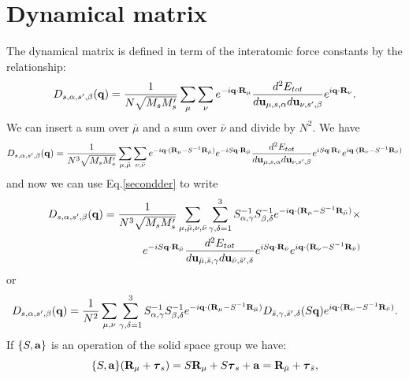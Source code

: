 \documentclass[12pt,a4paper,twoside]{report}
\begin{document}
\section{Dynamical matrix}

The dynamical matrix is defined in term of the interatomic force constants by the relationship:
\begin{equation}
D_{s,\alpha,s',\beta}({\bf q}) =
{1 \over N \sqrt{M_s M_s'}} \sum_{\mu} \sum_{\nu}
e^{-i {\bf q} \cdot {\bf R}_\mu}
{d^2 E_{tot} \over d {\bf u}_{\mu,s,\alpha} d {\bf u}_{\nu,s',\beta}}
e^{i {\bf q} \cdot {\bf R}_\nu}.
\label{dyn_mat}
\end{equation}
We can insert a sum over $\bar \mu$ and a sum over
$\bar \nu$ and divide by $N^2$. We have
\begin{equation}
D_{s,\alpha,s',\beta}({\bf q}) =
{1 \over N^3 \sqrt{M_s M_s'}} \sum_{\mu,\bar \mu} \sum_{\nu,\bar \nu}
e^{-i {\bf q} \cdot ({\bf R}_\mu - S^{-1}{\bf R}_{\bar \mu}) }
e^{-i S {\bf q} \cdot {\bf R}_{\bar \mu}}
{d^2 E_{tot} \over d {\bf u}_{\mu,s,\alpha} d {\bf u}_{\nu,s',\beta}}
e^{i S {\bf q} \cdot {\bf R}_{\bar \nu}}
e^{i {\bf q} \cdot ({\bf R}_\nu - S^{-1}{\bf R}_{\bar \nu})}
\end{equation}
and now we can use Eq.\ref{secondder} to write
\begin{eqnarray}
D_{s,\alpha,s',\beta}({\bf q}) =
{1 \over N^3 \sqrt{M_s M_s'}} \sum_{\mu,\bar \mu, \nu,\bar \nu} \sum_{\gamma,\delta=1}^3  S^{-1}_{\alpha,\gamma} S^{-1}_{\beta,\delta}
e^{-i {\bf q} \cdot ({\bf R}_\mu - S^{-1}{\bf R}_{\bar \mu}) } \times \nonumber \\
e^{-i S{\bf q} \cdot {\bf R}_{\bar \mu}}
{d^2 E_{tot} \over d {\bf u}_{{\bar \mu},{\bar s},\gamma}d {\bf u}_{{\bar \nu},{\bar s}',\delta} }
e^{i S{\bf q} \cdot {\bf R}_{\bar \nu}}
e^{i {\bf q} \cdot ({\bf R}_\nu - S^{-1}{\bf R}_{\bar \nu})}
\end{eqnarray}
or
\begin{equation}
D_{s,\alpha,s',\beta}({\bf q}) =
{1 \over N^2 }\sum_{\mu, \nu} \sum_{\gamma,\delta=1}^3  S^{-1}_{\alpha,\gamma} S^{-1}_{\beta,\delta}
e^{-i {\bf q} \cdot ({\bf R}_\mu - S^{-1}{\bf R}_{\bar \mu}) }
D_{\bar s,\gamma,\bar s',\delta}(S{\bf q})
e^{i {\bf q} \cdot ({\bf R}_\nu - S^{-1}{\bf R}_{\bar \nu})}.
\end{equation}
If $\{S,{\bf a}\}$ is an operation of the solid space group we have:
\begin{equation}
\{S,{\bf a}\} ({\bf R}_\mu + \boldsymbol{\tau}_{s}) = 
S {\bf R}_\mu + S \boldsymbol{\tau}_{s} +{\bf a}=
{\bf R}_{\bar \mu} + \boldsymbol{\tau}_{\bar s},
\end{equation}
\end{document}
